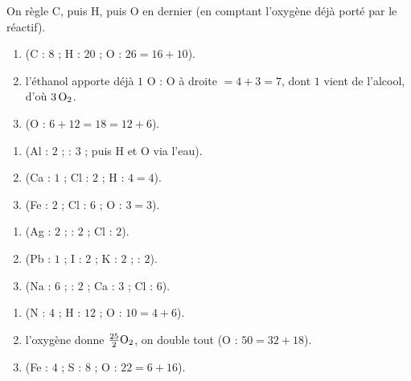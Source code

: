 \documentclass[11pt,a4paper]{article}
\begin{document}
\begin{corrige}
On règle C, puis H, puis O en dernier (en comptant l'oxygène déjà porté par le réactif).
\begin{enumerate}[label=\alph*)]
  \item {} \; (C : $8$ ; H : $20$ ; O : $26=16+10$).
  \item {} \; l'éthanol apporte déjà $1$ O :
        O à droite $=4+3=7$, dont $1$ vient de l'alcool, d'où $3\,\ce{O2}$.
  \item {} \; (O : $6+12=18=12+6$).
\end{enumerate}
\end{corrige}

\begin{corrige}
\begin{enumerate}[label=\alph*)]
  \item {} \; (Al : $2$ ;  : $3$ ; puis H et O
        via l'eau).
  \item {} \; (Ca : $1$ ; Cl : $2$ ; H : $4=4$).
  \item {} \; (Fe : $2$ ; Cl : $6$ ; O : $3=3$).
\end{enumerate}
\end{corrige}

\begin{corrige}
\begin{enumerate}[label=\alph*)]
  \item {} \; (Ag : $2$ ;  : $2$ ; Cl : $2$).
  \item {} \; (Pb : $1$ ; I : $2$ ; K : $2$ ;  : $2$).
  \item {} \; (Na : $6$ ;  : $2$ ; Ca : $3$ ;
        Cl : $6$).
\end{enumerate}
\end{corrige}

\begin{corrige}
\begin{enumerate}[label=\alph*)]
  \item {} \; (N : $4$ ; H : $12$ ; O : $10=4+6$).
  \item {} \; l'oxygène donne $\tfrac{25}{2}\ce{O2}$, on
        double tout (O : $50=32+18$).
  \item {} \; (Fe : $4$ ; S : $8$ ; O : $22=6+16$).
\end{enumerate}
\end{corrige}
\end{document}
